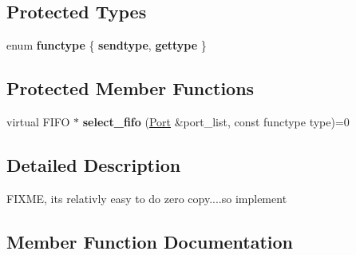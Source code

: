 \subsection*{Protected Types}
\begin{DoxyCompactItemize}
\item 
\hypertarget{classsplitmethod_a55be00e14bebb5a2df32666ca46a1592}{}enum {\bfseries functype} \{ {\bfseries sendtype}, 
{\bfseries gettype}
 \}\label{classsplitmethod_a55be00e14bebb5a2df32666ca46a1592}

\end{DoxyCompactItemize}
\subsection*{Protected Member Functions}
\begin{DoxyCompactItemize}
\item 
\hypertarget{classsplitmethod_af9abd140d6baab12921bbd6bc397b514}{}virtual F\+I\+F\+O $\ast$ {\bfseries select\+\_\+fifo} (\hyperlink{class_port}{Port} \&port\+\_\+list, const functype type)=0\label{classsplitmethod_af9abd140d6baab12921bbd6bc397b514}

\end{DoxyCompactItemize}


\subsection{Detailed Description}
F\+I\+X\+M\+E, it\textquotesingle{}s relativly easy to do zero copy....so implement 

\subsection{Member Function Documentation}
\hypertarget{classsplitmethod_af9067e627d58d344cd1b11bc9d3e92d6}{}
